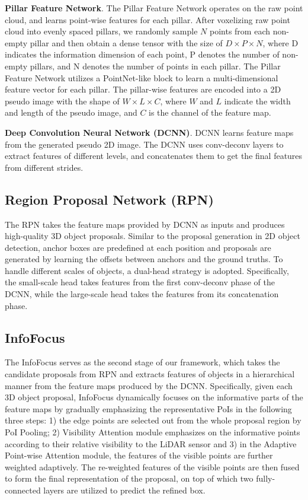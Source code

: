 \documentclass[runningheads]{llncs}
\begin{document}
\noindent\textbf{Pillar Feature Network}.
The Pillar Feature Network operates on the raw point cloud, and learns point-wise features for each pillar. After voxelizing raw point cloud into evenly spaced pillars, we randomly sample $N$ points from each non-empty pillar and then obtain a dense tensor with the size of $ D \times P \times N $, where D indicates the information dimension of each point, P denotes the number of non-empty pillars, and N denotes the number of points in each pillar. The Pillar Feature Network utilizes a PointNet-like block to learn a multi-dimensional feature vector for each pillar. The pillar-wise features are encoded into a 2D pseudo image with the shape of $ W \times L \times C $, where $W$ and $L$ indicate the width and length of the pseudo image, and $C$ is the channel of the feature map. 

\noindent\textbf{Deep Convolution Neural Network (DCNN)}.
DCNN learns feature maps from the generated pseudo 2D image. The DCNN uses conv-deconv layers to extract features of different levels, and concatenates them to get the final features from different strides.

\subsection{Region Proposal Network (RPN)}
The RPN takes the feature maps provided by DCNN as inputs and produces high-quality 3D object proposals. Similar to the proposal generation in 2D object detection, anchor boxes are predefined at each position and proposals are generated by learning the offsets between anchors and the ground truths. To handle different scales of objects, a dual-head strategy is adopted. Specifically, the small-scale head takes features from the first conv-deconv phase of the DCNN, while the large-scale head takes the features from its concatenation phase.

\subsection{InfoFocus}
The InfoFocus serves as the second stage of our framework, which takes the candidate proposals from RPN and extracts features of objects in a hierarchical manner from the feature maps produced by the DCNN. Specifically, given each 3D object proposal, InfoFocus dynamically focuses on the informative parts of the feature maps by gradually emphasizing the representative PoIs in the following three steps: 1) the edge points are selected out from the whole proposal region by PoI Pooling; 2) Visibility Attention module emphasizes on the informative points according to their relative visibility to the LiDAR sensor and 3) in the Adaptive Point-wise Attention module, the features of the visible points are further weighted adaptively. The re-weighted features of the visible points are then fused to form the final representation of the proposal, on top of which two fully-connected layers are utilized to predict the refined box.
\end{document}
